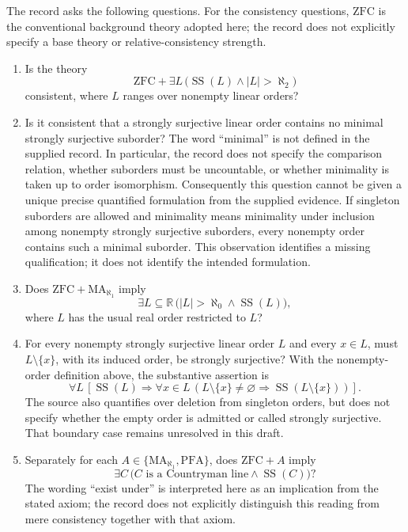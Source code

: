 \documentclass[11pt]{article}
\newcommand{\R}{\mathbb{R}}
\begin{document}
The record asks the following questions. For the consistency questions, \(\mathrm{ZFC}\) is the conventional background theory adopted here; the record does not explicitly specify a base theory or relative-consistency strength.
\begin{enumerate}
\item Is the theory
\[
\mathrm{ZFC}+\exists L\,\bigl(\operatorname{SS}(L)\land |L|>\aleph_2\bigr)
\]
consistent, where \(L\) ranges over nonempty linear orders?

\item Is it consistent that a strongly surjective linear order contains no minimal strongly surjective suborder? The word ``minimal'' is not defined in the supplied record. In particular, the record does not specify the comparison relation, whether suborders must be uncountable, or whether minimality is taken up to order isomorphism. Consequently this question cannot be given a unique precise quantified formulation from the supplied evidence. If singleton suborders are allowed and minimality means minimality under inclusion among nonempty strongly surjective suborders, every nonempty order contains such a minimal suborder. This observation identifies a missing qualification; it does not identify the intended formulation.

\item Does \(\mathrm{ZFC}+\mathrm{MA}_{\aleph_1}\) imply
\[
\exists L\subseteq\R\,\bigl(|L|>\aleph_0\land\operatorname{SS}(L)\bigr),
\]
where \(L\) has the usual real order restricted to \(L\)?

\item For every nonempty strongly surjective linear order \(L\) and every \(x\in L\), must \(L\setminus\{x\}\), with its induced order, be strongly surjective? With the nonempty-order definition above, the substantive assertion is
\[
\forall L\,\left[\operatorname{SS}(L)\Longrightarrow
\forall x\in L\,\left(L\setminus\{x\}\ne\varnothing
\Longrightarrow\operatorname{SS}(L\setminus\{x\})\right)\right].
\]
The source also quantifies over deletion from singleton orders, but does not specify whether the empty order is admitted or called strongly surjective. That boundary case remains unresolved in this draft.

\item Separately for each \(A\in\{\mathrm{MA}_{\aleph_1},\mathrm{PFA}\}\), does \(\mathrm{ZFC}+A\) imply
\[
\exists C\,\bigl(C\text{ is a Countryman line}\land\operatorname{SS}(C)\bigr)?
\]
The wording ``exist under'' is interpreted here as an implication from the stated axiom; the record does not explicitly distinguish this reading from mere consistency together with that axiom.
\end{enumerate}
\end{document}
